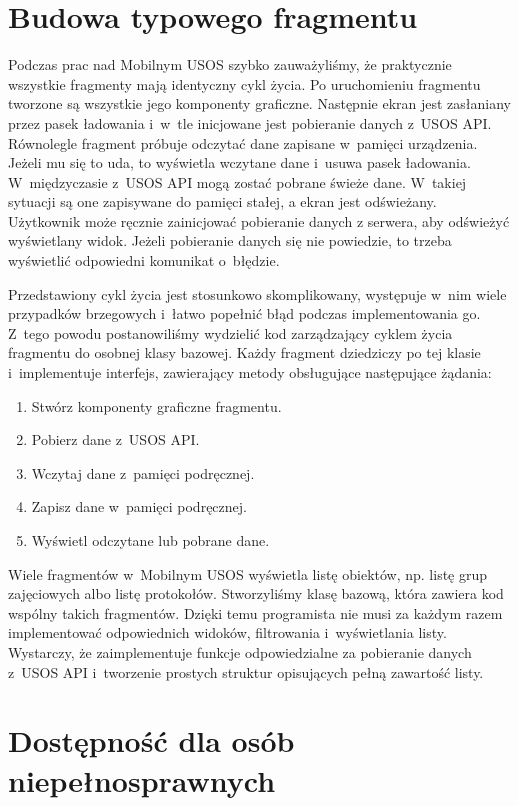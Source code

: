 \documentclass{pracamgr}
\begin{document}
\section{Budowa typowego fragmentu}
\label{sec:budowa}

Podczas prac nad Mobilnym USOS szybko zauważyliśmy, że praktycznie wszystkie
fragmenty mają identyczny cykl życia. Po uruchomieniu fragmentu tworzone są
wszystkie jego komponenty graficzne. Następnie ekran jest zasłaniany przez pasek
ładowania i~w~tle inicjowane jest pobieranie danych z~USOS API. Równolegle fragment
próbuje odczytać dane zapisane w~pamięci urządzenia. Jeżeli mu się to uda, to
wyświetla wczytane dane i~usuwa pasek ładowania. W~międzyczasie z~USOS API mogą
zostać pobrane świeże dane. W~takiej sytuacji są one zapisywane do pamięci stałej,
a ekran jest odświeżany. Użytkownik może ręcznie zainicjować pobieranie danych z
serwera, aby odświeżyć wyświetlany widok. Jeżeli pobieranie danych się nie powiedzie,
to trzeba wyświetlić odpowiedni komunikat o~błędzie.

Przedstawiony cykl życia jest stosunkowo skomplikowany, występuje w~nim wiele
przypadków brzegowych i~łatwo popełnić błąd podczas implementowania go. Z~tego
powodu postanowiliśmy wydzielić kod zarządzający cyklem życia fragmentu do osobnej
klasy bazowej. Każdy fragment dziedziczy po tej klasie i~implementuje interfejs,
zawierający metody obsługujące następujące żądania:

\begin{enumerate}
	\item Stwórz komponenty graficzne fragmentu.
	\item Pobierz dane z~USOS API.
	\item Wczytaj dane z~pamięci podręcznej.
	\item Zapisz dane w~pamięci podręcznej.
	\item Wyświetl odczytane lub pobrane dane.
\end{enumerate}

Wiele fragmentów w~Mobilnym USOS wyświetla listę obiektów, np. listę grup zajęciowych
albo listę protokołów. Stworzyliśmy klasę bazową, która zawiera kod wspólny takich
fragmentów. Dzięki temu programista nie musi za każdym razem implementować odpowiednich
widoków, filtrowania i~wyświetlania listy. Wystarczy, że zaimplementuje funkcje
odpowiedzialne za pobieranie danych z~USOS API i~tworzenie prostych struktur
opisujących pełną zawartość listy.

\section{Dostępność dla osób niepełnosprawnych}
\end{document}

